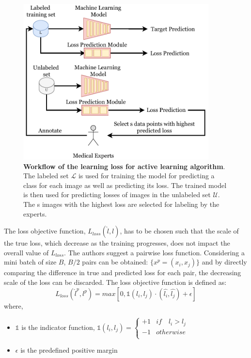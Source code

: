\begin{figure}[htbp]
\centering
\captionsetup{format=plain}
\includegraphics[keepaspectratio,width=0.9\textwidth]{figures/fig_learning_loss_for_active_learning.pdf}
\caption[Workflow of the learning loss for active learning algorithm]{\textbf{Workflow of the learning loss for active learning algorithm}. The labeled set $\mathcal{L}$ is used for training the model for predicting a class for each image as well as predicting its loss. The trained model is then used for predicting losses of images in the unlabeled set $\mathcal{U}$. The s images with the highest loss are selected for labeling by the experts.}
\label{fig:learning_loss_for_active_learning}
\end{figure}

The loss objective function, $L_{loss}(\hat{l}, l)$, has to be chosen such that the scale of the true loss, which decrease as the training progresses, does not impact the overall value of $L_{loss}$. The authors suggest a pairwise loss function. Considering a mini batch of size $B$, $B/2$ pairs can be obtained: $\{x^p = (x_i, x_j)\}$ and by directly comparing the difference in true and predicted loss for each pair, the decreasing scale of the loss can be discarded. The loss objective function is defined as:
\begin{equation}
    \label{equation:learning_loss_pair_wise_loss}
    L_{loss}(\hat{l}^{p}, l^{p}) = max [0, \mathbb{1}(l_i, l_j)\cdot(\hat{l_i}, \hat{l_j}) + \epsilon ]
\end{equation}
where,
\begin{itemize}[label={}]
  \setlength\itemsep{0em}
  \item $\mathbb{1}$ is the indicator function, $\mathbb{1}(l_i, l_j) = \begin{cases} 
      +1 & if \quad l_i > l_j \\
      -1 & otherwise \\
   \end{cases}$
   \item $\epsilon$ is the predefined positive margin
\end{itemize}

